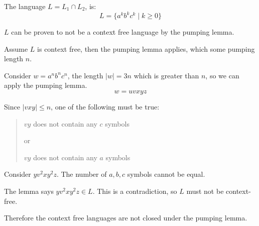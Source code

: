 \documentclass[11pt]{article}
\makeatletter
\newcommand{\mathcenter}{\@fleqnfalse}
\makeatother
\begin{document}
\mathcenter
The language $L = L_1 \cap L_2$, is:
$$L = \{a^k b^k c^k \mid k \geq 0 \}$$

$L$ can be proven to not be a context free language by the pumping lemma.

Assume $L$ is context free, then the pumping lemma applies, which some pumping
length $n$.

Consider $w = a^n b^n c^n$, the length $|w|=3n$ which is greater than $n$, so we
can apply the pumping lemma.
$$w = uvxyz$$

Since $|vxy| \leq n$, one of the following must be true:
\begin{quote}
$vy$ does not contain any $c$ symbols

or 

$vy$ does not contain any $a$ symbols
\end{quote}

Consider $yv^2xy^2z$. The number of $a,b,c$ symbols cannot be equal.

The lemma says $yv^2xy^2z \in L$. This is a contradiction, so $L$ must not be
context-free.

Therefore the context free languages are not closed under the pumping lemma.
\end{document}
